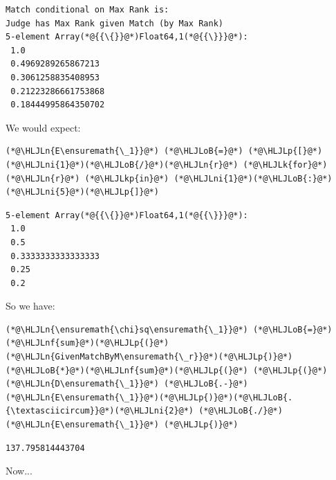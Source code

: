 \documentclass[12pt,a4paper]{article}
\newcommand{\HLJLk}[1]{\textcolor[RGB]{148,91,176}{\textbf{#1}}}
\newcommand{\HLJLkp}[1]{\textcolor[RGB]{148,91,176}{\textbf{#1}}}
\newcommand{\HLJLn}[1]{#1}
\newcommand{\HLJLnf}[1]{\textcolor[RGB]{66,102,213}{#1}}
\newcommand{\HLJLni}[1]{\textcolor[RGB]{59,151,46}{#1}}
\newcommand{\HLJLoB}[1]{\textcolor[RGB]{102,102,102}{\textbf{#1}}}
\newcommand{\HLJLp}[1]{#1}
\begin{document}
\begin{lstlisting}
Match conditional on Max Rank is:
Judge has Max Rank given Match (by Max Rank)
5-element Array(*@{{\{}}@*)Float64,1(*@{{\}}}@*):
 1.0
 0.4969289265867213
 0.3061258835408953
 0.21223286661753868
 0.18444995864350702
\end{lstlisting}


We would expect:


\begin{lstlisting}
(*@\HLJLn{E\ensuremath{\_1}}@*) (*@\HLJLoB{=}@*) (*@\HLJLp{[}@*)(*@\HLJLni{1}@*)(*@\HLJLoB{/}@*)(*@\HLJLn{r}@*) (*@\HLJLk{for}@*) (*@\HLJLn{r}@*) (*@\HLJLkp{in}@*) (*@\HLJLni{1}@*)(*@\HLJLoB{:}@*)(*@\HLJLni{5}@*)(*@\HLJLp{]}@*)
\end{lstlisting}

\begin{lstlisting}
5-element Array(*@{{\{}}@*)Float64,1(*@{{\}}}@*):
 1.0
 0.5
 0.3333333333333333
 0.25
 0.2
\end{lstlisting}


So we have:


\begin{lstlisting}
(*@\HLJLn{\ensuremath{\chi}sq\ensuremath{\_1}}@*) (*@\HLJLoB{=}@*) (*@\HLJLnf{sum}@*)(*@\HLJLp{(}@*)(*@\HLJLn{GivenMatchByM\ensuremath{\_r}}@*)(*@\HLJLp{)}@*)(*@\HLJLoB{*}@*)(*@\HLJLnf{sum}@*)(*@\HLJLp{(}@*) (*@\HLJLp{(}@*)(*@\HLJLn{D\ensuremath{\_1}}@*) (*@\HLJLoB{.-}@*) (*@\HLJLn{E\ensuremath{\_1}}@*)(*@\HLJLp{)}@*)(*@\HLJLoB{.{\textasciicircum}}@*)(*@\HLJLni{2}@*) (*@\HLJLoB{./}@*) (*@\HLJLn{E\ensuremath{\_1}}@*) (*@\HLJLp{)}@*)
\end{lstlisting}

\begin{lstlisting}
137.795814443704
\end{lstlisting}


Now...
\end{document}
